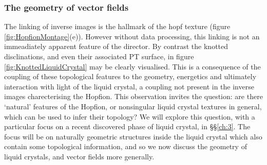 \subsubsection{The geometry of vector fields}
The linking of inverse images is the hallmark of the hopf texture (figure \ref{fig:HopfionMontage}(e)). However without data processing, this linking is not an immeadiately apparent feature of the director. By contrast the knotted disclinations, and even their associated PT surface, in figure \ref{fig:KnottedLiquidCrystal} may be clearly visualised. This is a consequence of the coupling of these topological features to the geometry, energetics and ultimately interaction with light of the liquid crystal, a coupling not present in the inverse images charecterising the Hopfion. This observation invites the question: are there `natural' features of the Hopfion, or nonsingular liquid crystal textures in general, which can be used to infer their topology? We will explore this question, with a particular focus on a recent discovered phase of liquid crystal, in \S\S\ref{ch:3}. The focus will be on naturally geometric structures inside the liquid crystal which also contain some topological information, and so we now discuss the geometry of liquid crystals, and vector fields more generally. 

